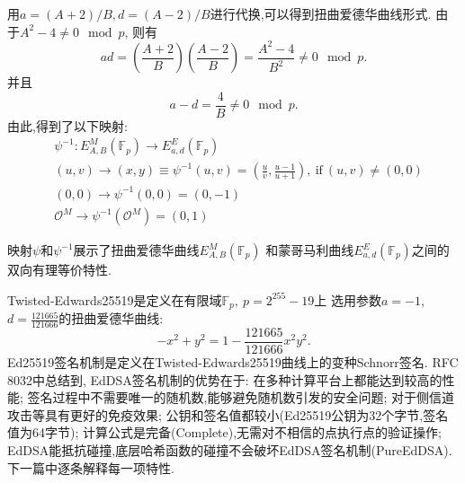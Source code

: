 \documentclass{article}
\newcommand{\F}{\mathbb{F}}
\begin{document}
用$a = (A+2)/B, d = (A-2)/B$进行代换,可以得到扭曲爱德华曲线形式. 
由于$A^2-4\neq0\mod p$, 则有
$$ad = \left(\frac{A+2}{B}\right)\left(\frac{A-2}{B}\right) = \frac{A^2-4}{B^2}\neq 0\mod p.$$
并且
$$a-d = \frac{4}{B} \neq 0 \mod p.$$
由此,得到了以下映射:
\begin{equation*}
\begin{array}{cc}
& \psi^{-1}: E_{A,B}^M(\F_p) \rightarrow   E_{a,d}^E(\F_p)\\
& (u,v) \rightarrow (x,y) \equiv \psi^{-1}(u, v) = \left( \frac{u}{v}, \frac{u-1}{u+1} \right),\ \text{if}\ (u,v)\neq(0,0)\\
& (0,0) \rightarrow \psi^{-1}(0,0) = (0, -1) \\
& \mathcal{O}^M \rightarrow \psi^{-1}(\mathcal{O}^M) = (0,1)
\end{array}
\end{equation*}

映射$\psi$和$\psi^{-1}$展示了扭曲爱德华曲线$E_{A,B}^M(\F_p)$
和蒙哥马利曲线$ E_{a,d}^E(\F_p)$之间的双向有理等价特性.

Twisted-Edwards25519是定义在有限域$\F_p, \ p = 2^{255}-19$上
选用参数$a=-1$, $d = \frac{121665}{121666}$的扭曲爱德华曲线:
$$-x^2 + y^2 = 1 - \frac{121665}{121666}x^2y^2.$$
Ed25519签名机制是定义在Twisted-Edwards25519曲线上的变种Schnorr签名.
RFC 8032中总结到, EdDSA签名机制的优势在于: 在多种计算平台上都能达到较高的性能;
签名过程中不需要唯一的随机数,能够避免随机数引发的安全问题; 
对于侧信道攻击等具有更好的免疫效果; 公钥和签名值都较小(Ed25519公钥为32个字节,签名值为64字节);
计算公式是完备(Complete),无需对不相信的点执行点的验证操作;
EdDSA能抵抗碰撞,底层哈希函数的碰撞不会破坏EdDSA签名机制(PureEdDSA).
下一篇中逐条解释每一项特性.
\end{document}
